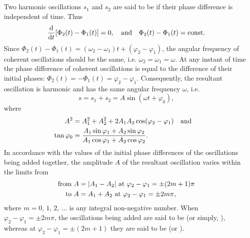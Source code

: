 \subsection{}\label{28.4.3} Two harmonic oscillations $s_{1}$ and $s_{2}$ are said to be  if their phase difference is independent of time. Thus
\begin{equation}%
\dv{t}[ \Phi_{2}(t) - \Phi_{1}(t) ]= 0, \qand \Phi_{2}(t)- \Phi_{1}(t) = \text{const}.
\end{equation}
Since $\Phi_{2} (t) - \Phi_{1}(t) = (\omega_{2} - \omega_{1}) t + (\varphi_{2} - \varphi_{1})$, the angular frequency of coherent oscillations should be the same, i.e. $\omega_{2}= \omega_{1}= \omega$. At any instant of time the phase difference of coherent oscillations is equal to the difference of their initial phases:   $\Phi_{2}(t)=-\Phi_{1}(t)= \varphi_{2}- \varphi_{1}$. Consequently, the resultant oscillation is harmonic and has the same angular frequency $\omega$, i.e.
\begin{equation*}%
s = s_{1} + s_{2} = A \sin(\omega t + \varphi_{0}),
\end{equation*}
where
\begin{align*}%
A^{2} & = A_{1}^{2}+ A_{2}^{2} + 2A_{1}A_{2} \cos(\varphi_{2}- \varphi_{1}) \qand \\
\tan \varphi_{0} & = \frac{A_{1}\sin \varphi_{1} + A_{2}\sin \varphi_{2}}{A_{1}\cos \varphi_{1} + A_{2}\cos \varphi_{2}}.
\end{align*}
In accordance with the values of the initial phase differences of the oscillations being added together, the amplitude $A$ of the resultant oscillation varies within the limits from 
\begin{align*}%
\text{from} \,\, A & = \abs{A_{1} - A_{2}} \,\,  \text{at} \,\,   \varphi_{2} - \varphi_{1}  = \pm (2m + 1)\pi \\
\text{to} \,\, A & = A_{1} + A_{2} \,\,  \text{at} \,\,   \varphi_{2} - \varphi_{1}  = \pm 2m \pi,
\end{align*}
where $m = 0,\, 1,\, 2, \,\ldots{}$ is any integral non-negative number. When $\varphi_{2} - \varphi_{1} = \pm 2m \pi$, the oscillations being added are said to be  (or simply, ), whereas at $\varphi_{2} - \varphi_{1} = \pm (2m+ 1)$ they are said to be  (or ). 


